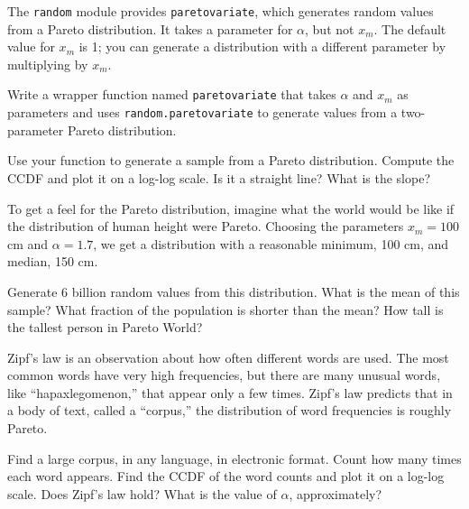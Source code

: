 \documentclass[12pt]{book}
\begin{document}
\begin{exercise}
The {\tt random} module provides {\tt paretovariate},
which generates random values from a Pareto distribution.  It takes
a parameter for $\alpha$, but not $x_m$.  The
default value for $x_m$ is 1; you can generate a distribution
with a different parameter by multiplying by $x_m$.


Write a wrapper function named {\tt paretovariate} that takes $\alpha$
and $x_m$ as parameters and uses {\tt random.paretovariate} to
generate values from a two-parameter Pareto distribution.


Use your function to generate a sample from a Pareto distribution.
Compute the CCDF and plot it on a log-log scale.  Is it a straight
line?  What is the slope?


\end{exercise}

\begin{exercise}
To get a feel for the Pareto distribution, imagine what the world
would be like if the distribution of human height were Pareto.
Choosing the parameters $x_m = 100$ cm and $\alpha = 1.7$, we
get a distribution with a reasonable minimum, 100 cm,
and median, 150 cm.


Generate 6 billion random values from this distribution.  What is the
mean of this sample?  What fraction of the population is shorter than
the mean?  How tall is the tallest person in Pareto World?


\end{exercise}

\begin{exercise}
Zipf's law is an observation about how often different words are used.
The most common words have very high frequencies, but there are many
unusual words, like ``hapaxlegomenon,'' that appear only a few times.
Zipf's law predicts that in a body of text, called a ``corpus,'' the
distribution of word frequencies is roughly Pareto.


Find a large corpus, in any language, in electronic
format.  Count how many times each word appears.  Find the CCDF of the
word counts and plot it on a log-log scale.  Does Zipf's law hold?
What is the value of $\alpha$, approximately?


\end{exercise}
\end{document}
